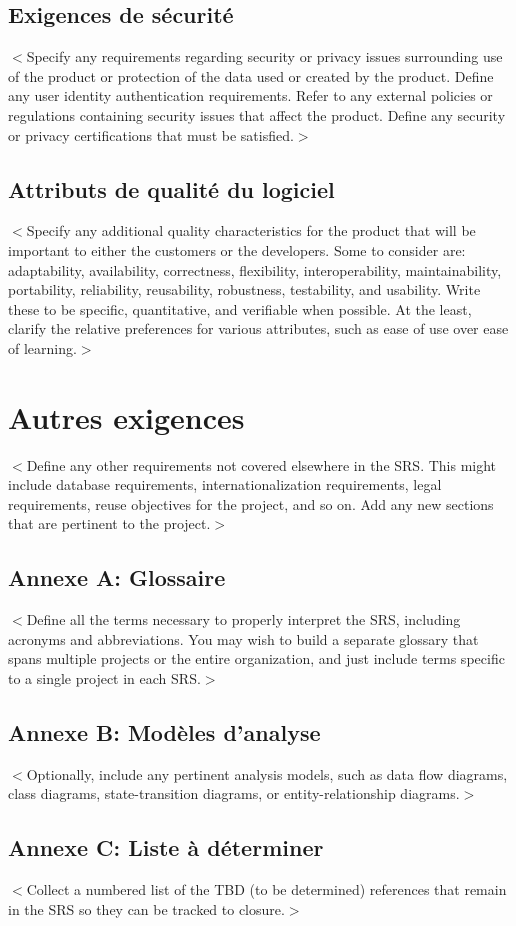 \documentclass[titlepage]{report}
\begin{document}
\section{Exigences de sécurité}
$<$Specify any requirements regarding security or privacy issues surrounding use 
of the product or protection of the data used or created by the product. Define 
any user identity authentication requirements. Refer to any external policies or 
regulations containing security issues that affect the product. Define any 
security or privacy certifications that must be satisfied.$>$

\section{Attributs de qualité du logiciel}
$<$Specify any additional quality characteristics for the product that will be 
important to either the customers or the developers. Some to consider are: 
adaptability, availability, correctness, flexibility, interoperability, 
maintainability, portability, reliability, reusability, robustness, testability, 
and usability. Write these to be specific, quantitative, and verifiable when 
possible. At the least, clarify the relative preferences for various attributes, 
such as ease of use over ease of learning.$>$

\chapter{Autres exigences}
$<$Define any other requirements not covered elsewhere in the SRS. This might 
include database requirements, internationalization requirements, legal 
requirements, reuse objectives for the project, and so on. Add any new sections 
that are pertinent to the project.$>$

\section{Annexe A: Glossaire}
$<$Define all the terms necessary to properly interpret the SRS, including 
acronyms and abbreviations. You may wish to build a separate glossary that spans 
multiple projects or the entire organization, and just include terms specific to 
a single project in each SRS.$>$

\section{Annexe B: Modèles d'analyse}
$<$Optionally, include any pertinent analysis models, such as data flow 
diagrams, class diagrams, state-transition diagrams, or entity-relationship 
diagrams.$>$

\section{Annexe C: Liste à déterminer}
$<$Collect a numbered list of the TBD (to be determined) references that remain 
in the SRS so they can be tracked to closure.$>$
\end{document}
